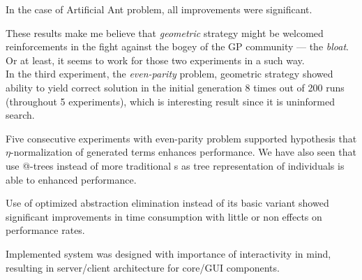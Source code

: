 \documentclass[12pt,a4paper]{report}
\makeatletter
\newcommand{\atTree}{@-tree\xspace}
\makeatother
\begin{document}
In the case of Artificial Ant problem, all improvements were significant.

These results make me believe that \textit{geometric} strategy might
be welcomed reinforcements in the fight against the bogey of 
the GP community --- the \textit{bloat}.
Or at least, it seems to work for those two experiments in a such way.\\


In the third experiment, the \textit{even-parity} problem, geometric strategy 
showed ability to yield correct solution in the initial generation
8 times out of 200 runs (throughout 5 experiments), which is interesting
result since it is uninformed search. 

Five consecutive experiments with even-parity problem supported 
hypothesis that $\eta$-normalization of generated terms enhances performance.
We have also seen that use \atTree{}s instead of more traditional \sexprTree{}s
as tree representation of individuals is able to enhanced performance.

Use of optimized abstraction elimination instead of its basic variant 
showed significant improvements in time consumption with little or 
non effects on performance rates.

Implemented system was designed with importance of interactivity in mind,
resulting in server/client architecture for core/GUI components.
\end{document}
